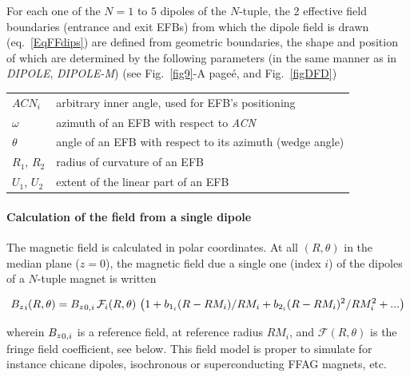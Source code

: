 \bigskip

\noindent For each one of the $N=1$ to $5$ dipoles of the  $N$-tuple, 
the 2 effective field boundaries (entrance and exit EFBs) from which  the dipole field  is drawn (eq.~\ref{EqFFdips}) are
defined from geometric boundaries, the shape and position of which are determined by the 
following parameters (in the same manner as in \textsl{DIPOLE}, \textsl{DIPOLE-M})
 (see Fig.~\ref{fig9}-A pageé\pageref{fig9}, and Fig.~\ref{figDFD}) 

\bigskip

\begin{tabular}{l!{~:}l}
	$ACN_i$  & arbitrary inner angle, used for EFB's positioning  \\
	$\omega$ &  azimuth of an EFB with respect to  \textsl{ACN}\\
	$\theta$ & angle of an EFB with respect to its azimuth (wedge angle)\\ 
	$R_1$, $R_2$  &  radius of curvature of an EFB\\
	$U_1$, $U_2$  &  extent of the linear part of an EFB  \\
\end{tabular}

\bigskip

\paragraph{Calculation of the field from a single dipole} 

 \noindent The magnetic field is calculated in  polar
coordinates.  At all $(R,\theta)$ in the median plane ($z=0$), the 
magnetic field  due  a single one (index $i$) of the  dipoles  of a $N$-tuple   magnet is written 

\begin{equation}
{B_z}_i(R,\theta) =  {B_z}_{0,i} \, \mathcal{F}_i(R,\theta) \, 
\left( 1 +  b_{1_i} (R-RM_{i})/RM_{i} + b_{2_i} (R-RM_{i})^2/RM_{i}^2 +... \right)
\label{EqFieldDipoles}
\end{equation}

\noindent wherein ${B_z}_{0,i}$  is a reference field, at reference radius  $RM_{i}$, 
 and $ \mathcal{F}(R,\theta)$ is the fringe field coefficient, see below. 
This field model is proper to simulate for instance chicane dipoles, isochronous 
or superconducting FFAG magnets, etc. 


